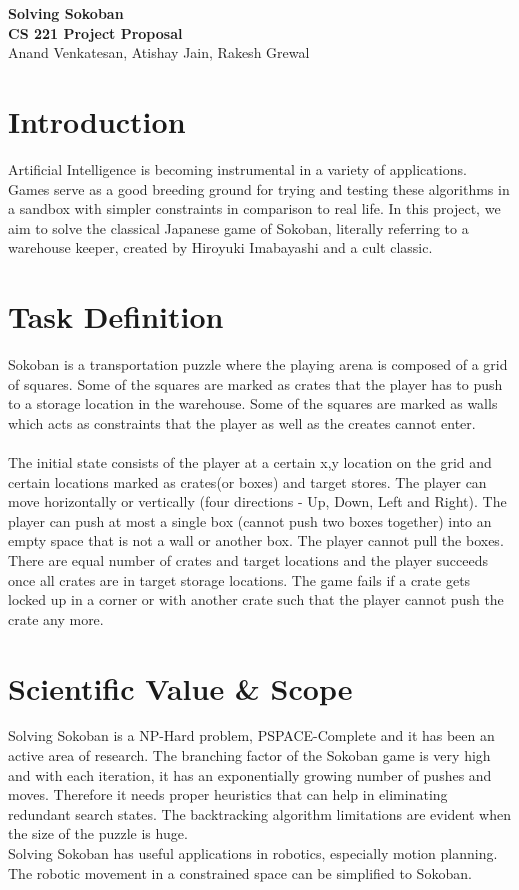 \documentclass[10pt, final]{article}
\begin{document}
\begin{center}
\LARGE{\textbf{Solving Sokoban}}\\
\Large{\textbf{CS 221 Project Proposal}}\\
\Large{Anand Venkatesan, Atishay Jain, Rakesh Grewal }
\end{center}

\section{Introduction}
Artificial Intelligence is becoming instrumental in a variety of applications. Games serve as a good breeding ground for trying and testing these algorithms in a sandbox with simpler constraints in comparison to real life. In this project, we aim to solve the classical Japanese game of Sokoban, literally referring to a warehouse keeper, created by Hiroyuki Imabayashi and a cult classic.

\section{Task Definition}
Sokoban is a transportation puzzle where the playing arena is composed of a grid of squares. Some of the squares are marked as crates that the player has to push to a storage location in the warehouse. Some of the squares are marked as walls which acts as constraints that the player as well as the creates cannot enter. \\
\\
The initial state consists of the player at a certain x,y location on the grid and certain locations marked as crates(or boxes) and target stores. The player can move horizontally or vertically (four directions - Up, Down, Left and Right). The player can push at most a single box (cannot push two boxes together) into an empty space that is not a wall or another box. The player cannot pull the boxes. There are equal number of crates and target locations and the player succeeds once all crates are in target storage locations. The game fails if a crate gets locked up in a corner or with another crate such that the player cannot push the crate any more.

\section{Scientific Value \& Scope}
Solving Sokoban is a NP-Hard problem, PSPACE-Complete\cite{1} and it has been an active area of research. The branching factor of the Sokoban game is very high and with each iteration, it has an exponentially growing number of pushes and moves. Therefore it needs proper heuristics that can help in eliminating redundant search states. The backtracking algorithm limitations are evident when the size of the puzzle is huge. \\
Solving Sokoban has useful applications in robotics, especially motion planning. The robotic movement in a constrained space can be simplified to Sokoban.
\end{document}
